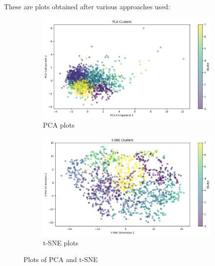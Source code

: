 \documentclass[a4paper, 24pt]{article}
\begin{document}
These are plots obtained after various approaches used:

\begin{figure}[H]
    \centering
    \begin{subfigure}{0.45\textwidth}
        \centering
        \includegraphics[width=\textwidth]{WhatsApp Image 2024-04-21 at 01.14.38_dc87b777.jpg}
        \caption{PCA plots}
        \label{fig:pca_plots}
    \end{subfigure}
    \hfill
    \begin{subfigure}{0.45\textwidth}
        \centering
        \includegraphics[width=\textwidth]{WhatsApp Image 2024-04-21 at 01.14.43_f7995f40.jpg}
        \caption{t-SNE plots}
        \label{fig:t-sne_plots}
    \end{subfigure}
    \caption{Plots of PCA and t-SNE}
    \label{fig:combined_plots2}
\end{figure}
\end{document}

